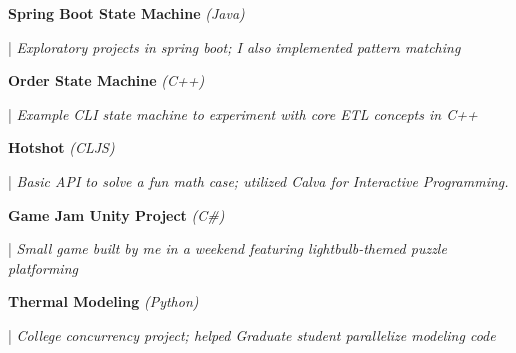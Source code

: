 \documentclass[letterpaper,11pt]{article}
\begin{document}
\begin{minipage}[t]{0.28\textwidth}
  \raggedright
  \textbf{ Spring Boot State Machine }\textit{(Java)} \\
\end{minipage}
\hfill
\begin{minipage}[t]{0.70\textwidth}
  \raggedright
  |\textit{ Exploratory projects in spring boot; I also implemented pattern matching } \\
\end{minipage}

\begin{minipage}[t]{0.28\textwidth}
  \raggedright
  \textbf{ Order State Machine }\textit{(C++)}\\
\end{minipage}
\hfill
\begin{minipage}[t]{0.70\textwidth}
  \raggedright
  |\textit{ Example CLI state machine to experiment with core ETL concepts in C++ } \\
\end{minipage}

\begin{minipage}[t]{0.28\textwidth}
  \raggedright
  \textbf{ Hotshot }\textit{(CLJS)}\\
\end{minipage}
\hfill
\begin{minipage}[t]{0.70\textwidth}
  \raggedright
  |\textit{ Basic API to solve a fun math case; utilized Calva for Interactive Programming.  } \\
\end{minipage}

\begin{minipage}[t]{0.28\textwidth}
  \raggedright
  \textbf{ Game Jam Unity Project }\textit{(C\#)} \\
\end{minipage}
\hfill
\begin{minipage}[t]{0.70\textwidth}
  \raggedright
  |\textit{ Small game built by me in a weekend featuring lightbulb-themed puzzle platforming} \\
\end{minipage}

\begin{minipage}[t]{0.28\textwidth}
  \raggedright
  \textbf{ Thermal Modeling }\textit{(Python)}\\
\end{minipage}
\hfill
\begin{minipage}[t]{0.70\textwidth}
  \raggedright
  |\textit{ College concurrency project; helped Graduate student parallelize modeling code } \\
\end{minipage}
\end{document}
